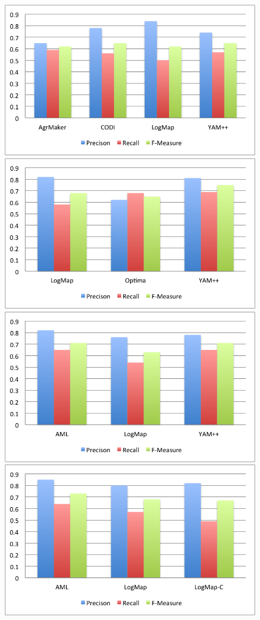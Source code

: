 \documentclass[11pt,titlepage,oneside,openany,a4paper]{report}
\begin{document}
\begin{figure}
 \includegraphics[scale=.5]{figures/oaei/conference/top2011.png} 
 \includegraphics[scale=.5]{figures/oaei/conference/top2012.png}
 \includegraphics[scale=.5]{figures/oaei/conference/top2013.png}  
 \includegraphics[scale=.5]{figures/oaei/conference/top2014.png} 

\end{figure}
\end{document}
